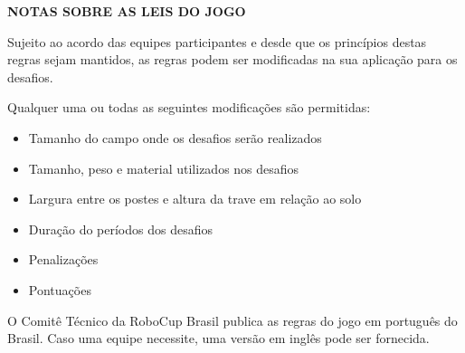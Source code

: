 \clearpage
\sffamily
{\bfseries\color[rgb]{0.4,0.4,0.4}
NOTAS SOBRE AS LEIS DO JOGO}

\bigskip

{\color[rgb]{0.4,0.4,0.4}{Modificações} }

Sujeito ao acordo das equipes participantes e desde que os princípios destas regras sejam mantidos, as regras podem ser modificadas na sua aplicação para os desafios.

Qualquer uma ou todas as seguintes modificações são permitidas:

\begin{itemize}
  \item Tamanho do campo onde os desafios serão realizados
  \item Tamanho, peso e material utilizados nos desafios
  \item Largura entre os postes e altura da trave em relação ao solo
  \item Duração do períodos dos desafios
  \item Penalizações
  \item Pontuações
\end{itemize}

\bigskip

{\color[rgb]{0.4,0.4,0.4}{Línguas oficiais}}

O Comitê Técnico da RoboCup Brasil publica as regras do jogo em português do Brasil. Caso uma equipe necessite, uma versão em inglês pode ser fornecida.


